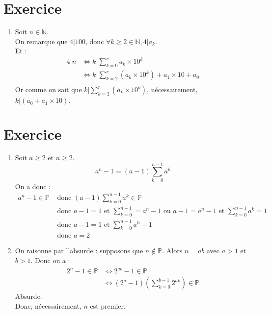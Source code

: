 \documentclass{report}
\begin{document}
\section{Exercice}
\begin{enumerate}
    \item Soit $n \in \mathbb{N}$. \\
    On remarque que $4 | 100$, donc $\forall k \geq 2 \in \mathbb{N}, 4 | a_k$. \\
    Et :
    \begin{align*}
        4|n &\Leftrightarrow k | \sum\limits_{k=0}^{r} a_k \times 10^k \\
        &\Leftrightarrow k|\sum\limits_{k=2}^{r} (a_k \times 10^k) + a_1 \times 10 + a_0 \\
    \end{align*}
    Or comme on sait que $k|\sum\limits_{k=2}^{r} (a_k \times 10^k)$, nécessairement,  $k|(a_0 + a_1 \times 10)$. 
\end{enumerate}

\setcounter{section}{7}
\section{Exercice}
\begin{enumerate}
    \item Soit $a \geq 2$ et $n \geq 2$. 
    $$a^n - 1 = (a - 1) \sum_{k = 0}^{n-1} a^k$$
    On a donc :
    \begin{align*}
        a^n - 1 \in \mathbb{P} &\text{ donc } (a - 1) \sum_{k = 0}^{n-1} a^k \in \mathbb{P} \\
        &\text{ donc } a - 1 = 1 \text{ et } \sum_{k = 0}^{n-1} = a^n - 1 \text{ ou } a - 1 = a^n - 1 \text{ et } \sum_{k = 0}^{n-1} a^k = 1 \\
        &\text{ donc } a - 1 = 1 \text{ et } \sum_{k=0}^{n-1} a^n - 1 \\
        &\text{ donc } a = 2 
    \end{align*} 

    \item On raisonne par l'absurde : supposons que $n \not \in \mathbb{P}$. Alors $n = ab$ avec $a > 1$ et $b > 1$. 
     Donc on a : 
     \begin{align*}
         2^n - 1 \in \mathbb{P} &\Leftrightarrow 2^{ab} - 1 \in \mathbb{P} \\
         &\Leftrightarrow (2^a - 1)(\sum_{k=0}^{b-1} 2^{ak}) \in \mathbb{P}
     \end{align*}
     Absurde. \\
     Donc, nécessairement, $n$ est premier. 
\end{enumerate}
\end{document}
